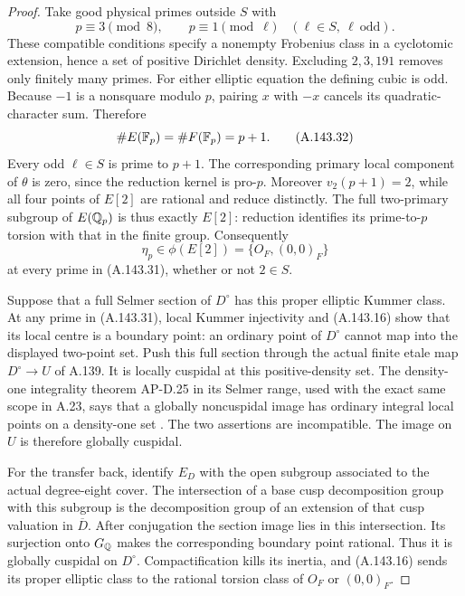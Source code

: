 \begin{proof}
Take good physical primes outside \(S\) with
\[
                   p\equiv3\pmod8,\qquad
                   p\equiv1\pmod\ell
                         \quad(\ell\in S,\ \ell\ \text{odd}).
\tag{A.143.31}
\]
These compatible conditions specify a nonempty Frobenius class
in a cyclotomic extension, hence a set of positive Dirichlet
density.  Excluding \(2,3,191\) removes only finitely many primes.
For either elliptic equation the defining cubic is odd.
Because \(-1\) is a nonsquare modulo \(p\), pairing \(x\) with
\(-x\) cancels its quadratic-character sum.  Therefore
\[
                    \#E(\mathbb F_p)=\#F(\mathbb F_p)=p+1 .
\tag{A.143.32}
\]
Every odd \(\ell\in S\) is prime to \(p+1\).
The corresponding primary local component of \(\theta\) is
zero, since the reduction kernel is pro-\(p\).
Moreover \(v_2(p+1)=2\), while all four points of \(E[2]\)
are rational and reduce distinctly.
The full two-primary subgroup of \(E(\mathbb Q_p)\) is thus exactly
\(E[2]\): reduction identifies its prime-to-\(p\) torsion
with that in the finite group.
Consequently
\[
                     \eta_p\in\phi(E[2])
                          =\{O_F,(0,0)_F\}
\tag{A.143.33}
\]
at every prime in (A.143.31), whether or not \(2\in S\).

Suppose that a full Selmer section of \(D^\circ\) has this
proper elliptic Kummer class.
At any prime in (A.143.31), local Kummer injectivity and
(A.143.16) show that its local centre is a boundary point:
an ordinary point of \(D^\circ\) cannot map into the displayed
two-point set.  Push this full section through the actual
finite etale map \(D^\circ\to U\) of A.139.
It is locally cuspidal at this positive-density set.
The density-one integrality theorem AP-D.25 in its Selmer range,
used with the exact same scope in A.23, says that a globally
noncuspidal image has ordinary integral local points on a
density-one set \cite[D.25]{LegAP2026}.
The two assertions are incompatible.  The image on \(U\) is
therefore globally cuspidal.

For the transfer back, identify \(E_D\) with the open subgroup
associated to the actual degree-eight cover.
The intersection of a base cusp decomposition group with this
subgroup is the decomposition group of an extension of that
cusp valuation in \(\overline D\).
After conjugation the section image lies in this intersection.
Its surjection onto \(G_\mathbb Q\) makes the corresponding boundary
point rational.  Thus it is globally cuspidal on \(D^\circ\).
Compactification kills its inertia, and (A.143.16) sends its
proper elliptic class to the rational torsion class of
\(O_F\) or \((0,0)_F\).


\end{proof}

